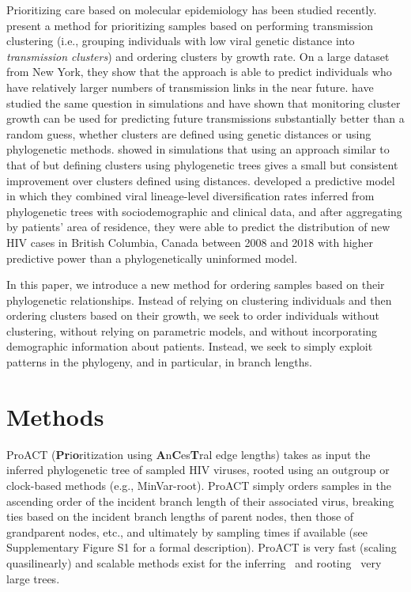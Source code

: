 \documentclass[a4paper,11pt]{article}
\newcommand{\authorcite}[1]{\citeauthor{#1}\supercite{#1}}
\newcommand{\PLWH}{sample\xspace}
\begin{document}
Prioritizing care based on molecular epidemiology has been studied recently. 
\authorcite{Wertheim2018} present a method for prioritizing \PLWH{s} based on performing transmission clustering (i.e., grouping individuals with low viral genetic distance into \textit{transmission clusters}) and ordering clusters  by growth rate.
On a large dataset from New York, they show that the approach is able to predict individuals who have relatively larger numbers of transmission links in the near future.
\authorcite{Moshiri2018} have studied the same question in simulations and have shown that monitoring cluster growth can be used for predicting future transmissions substantially better than a random guess, whether clusters are defined using genetic distances or using phylogenetic methods. 
\authorcite{Balaban2019}  showed in simulations that using an approach similar to that of \authorcite{Wertheim2018}  but defining clusters using phylogenetic trees gives a small but consistent improvement over clusters defined using  distances. 
\authorcite{McLaughlin2019} developed a predictive model in which they combined viral lineage-level diversification rates inferred from phylogenetic trees with sociodemographic and clinical data, and after aggregating by patients' area of residence, they were able to predict the distribution of new HIV cases in British Columbia, Canada between 2008 and 2018 with higher predictive power than a phylogenetically uninformed model.

In this paper, we introduce a new method for ordering \PLWH{s} based  on their phylogenetic relationships. Instead of relying on clustering individuals and then ordering clusters based on their growth, we seek to order individuals without clustering, without relying on parametric models, and without incorporating demographic information about patients. 
Instead, we seek to simply exploit patterns in the phylogeny, and in particular, in branch lengths. 


\section{Methods}
ProACT (\textbf{Pr}i\textbf{o}ritization using \textbf{A}n\textbf{C}es\textbf{T}ral edge lengths) takes as input the inferred phylogenetic tree of sampled HIV viruses, %
rooted using an outgroup or clock-based methods (e.g., MinVar-root\supercite{Mai2017}). 
ProACT simply orders \PLWH{s} in the ascending order of the incident branch length of their associated virus,  breaking ties based on the incident branch lengths of parent nodes, then those of grandparent nodes, etc., and ultimately by sampling times if available (see Supplementary Figure {S1} for a formal description).
ProACT is very fast (scaling quasilinearly) and scalable methods exist  for the inferring~\supercite{Price2010,Nguyen2015} and rooting~\supercite{Mai2017} very large trees.
\end{document}
